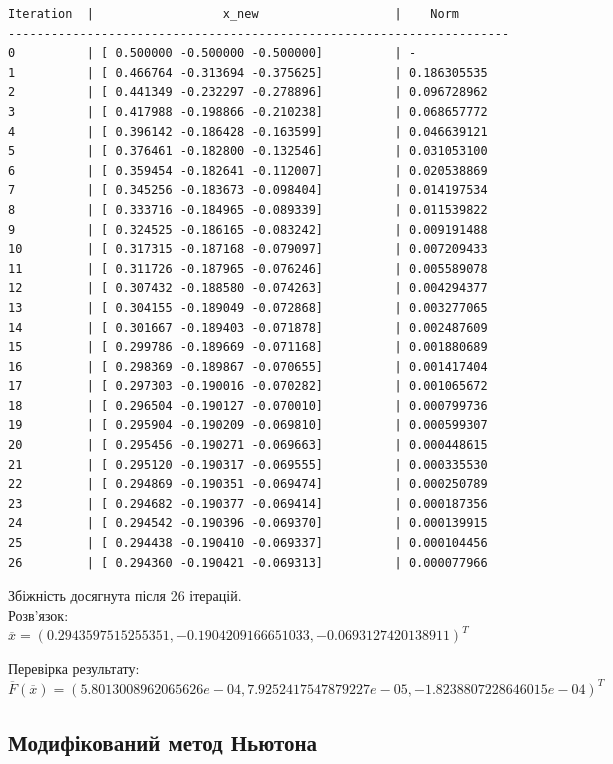 \documentclass[a4paper, 12pt]{article}
\begin{document}
\begin{verbatim}
Iteration  |                  x_new                   |    Norm   
----------------------------------------------------------------------
0          | [ 0.500000 -0.500000 -0.500000]          | -
1          | [ 0.466764 -0.313694 -0.375625]          | 0.186305535
2          | [ 0.441349 -0.232297 -0.278896]          | 0.096728962
3          | [ 0.417988 -0.198866 -0.210238]          | 0.068657772
4          | [ 0.396142 -0.186428 -0.163599]          | 0.046639121
5          | [ 0.376461 -0.182800 -0.132546]          | 0.031053100
6          | [ 0.359454 -0.182641 -0.112007]          | 0.020538869
7          | [ 0.345256 -0.183673 -0.098404]          | 0.014197534
8          | [ 0.333716 -0.184965 -0.089339]          | 0.011539822
9          | [ 0.324525 -0.186165 -0.083242]          | 0.009191488
10         | [ 0.317315 -0.187168 -0.079097]          | 0.007209433
11         | [ 0.311726 -0.187965 -0.076246]          | 0.005589078
12         | [ 0.307432 -0.188580 -0.074263]          | 0.004294377
13         | [ 0.304155 -0.189049 -0.072868]          | 0.003277065
14         | [ 0.301667 -0.189403 -0.071878]          | 0.002487609
15         | [ 0.299786 -0.189669 -0.071168]          | 0.001880689
16         | [ 0.298369 -0.189867 -0.070655]          | 0.001417404
17         | [ 0.297303 -0.190016 -0.070282]          | 0.001065672
18         | [ 0.296504 -0.190127 -0.070010]          | 0.000799736
19         | [ 0.295904 -0.190209 -0.069810]          | 0.000599307
20         | [ 0.295456 -0.190271 -0.069663]          | 0.000448615
21         | [ 0.295120 -0.190317 -0.069555]          | 0.000335530
22         | [ 0.294869 -0.190351 -0.069474]          | 0.000250789
23         | [ 0.294682 -0.190377 -0.069414]          | 0.000187356
24         | [ 0.294542 -0.190396 -0.069370]          | 0.000139915
25         | [ 0.294438 -0.190410 -0.069337]          | 0.000104456
26         | [ 0.294360 -0.190421 -0.069313]          | 0.000077966
\end{verbatim}

Збіжність досягнута після 26 ітерацій. \\
Розв'язок: 
\( \overline x = ( 0.2943597515255351, -0.1904209166651033, -0.0693127420138911 )^T \)

Перевірка результату: \\
\(\overline F(\overline{x}) = ( 5.8013008962065626e-04, 7.9252417547879227e-05, -1.8238807228646015e-04)^T \)

\newpage
\subsection{Модифікований метод Ньютона}
\end{document}
